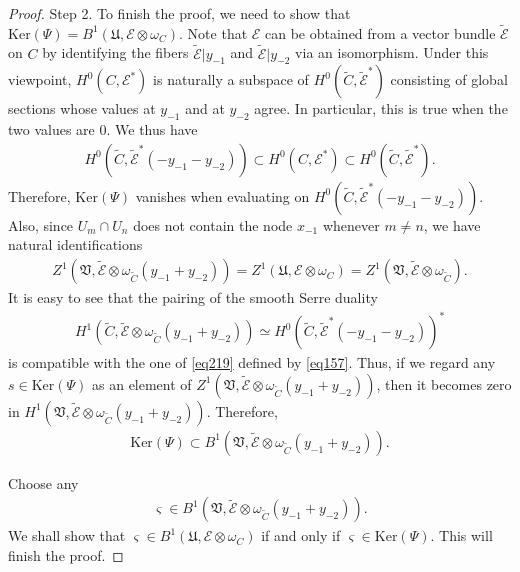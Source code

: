 \documentclass[12pt,b5paper,notitlepage]{report}
\theoremstyle{definition}
\theoremstyle{plain}
\newcommand{\fk}{\mathfrak}
\newcommand{\wtd}{\widetilde}
\newcommand{\scr}{\mathscr}
\newcommand{\sgm}{\varsigma}
\newcommand{\blt}{\bullet}
\newcommand{\Ker}{\mathrm{Ker}}
\numberwithin{equation}{section}
\begin{document}
\begin{proof}
Step 2. To finish the proof, we need to show that  $\Ker(\Psi)=B^1(\fk U,\scr E\otimes\omega_C)$. Note that $\scr E$ can be obtained from a vector bundle $\wtd{\scr E}$  on  $C$  by identifying the fibers $\wtd{\scr E}|y_{-1}$ and $\wtd{\scr E}|y_{-2}$ via an isomorphism. Under this viewpoint, $H^0(C,\scr E^*)$ is naturally a subspace of $H^0(\wtd C,\wtd{\scr E}^*)$ consisting of global sections whose values at $y_{-1}$ and at $y_{-2}$ agree. In particular, this is true when the two values are $0$. We thus have
\begin{align*}
H^0(\wtd C,\wtd{\scr E}^*(-y_{-1}-y_{-2}))\subset H^0(C,\scr E^*)\subset H^0(\wtd C,\wtd{\scr E}^*).
\end{align*}
Therefore, $\Ker(\Psi)$ vanishes when evaluating on $H^0(\wtd C,\wtd{\scr E}^*(-y_{-1}-y_{-2}))$. Also, since $U_m\cap U_n$ does not contain the node $x_{-1}$ whenever $m\neq n$, we have natural identifications
\begin{align*}
Z^1(\fk V,\wtd{\scr E}\otimes \omega_{\wtd C}(y_{-1}+y_{-2}))=Z^1(\fk U,\scr E\otimes \omega_C)=Z^1(\fk V,\wtd{\scr E}\otimes \omega_{\wtd C}).
\end{align*}
It is easy to see that the pairing of the smooth Serre duality
\begin{align}
H^1(\wtd C,\wtd{\scr E}\otimes\omega_{\wtd C}(y_{-1}+y_{-2}))\simeq H^0(\wtd C,\wtd{\scr E}^*(-y_{-1}-y_{-2}))^*\label{eq158}
\end{align}
is compatible with the one of \eqref{eq219} defined by \eqref{eq157}. Thus, if we regard any  $s\in\Ker(\Psi)$ as an element of $Z^1(\fk V,\wtd{\scr E}\otimes \omega_{\wtd C}(y_{-1}+y_{-2}))$, then it becomes zero in $H^1(\fk V,\wtd{\scr E}\otimes\omega_{\wtd C}(y_{-1}+y_{-2}))$. Therefore,
\begin{align*}
\Ker(\Psi)\subset B^1(\fk V,\wtd{\scr E}\otimes\omega_{\wtd C}(y_{-1}+y_{-2})).
\end{align*}

Choose any
\begin{align*}
\sgm\in B^1(\fk V,\wtd{\scr E}\otimes\omega_{\wtd C}(y_{-1}+y_{-2})).
\end{align*}
We shall show that $\sgm\in B^1(\fk U,\scr E\otimes\omega_C)$ if and only if $\sgm\in\Ker(\Psi)$. This will finish the proof.







\end{proof}
\end{document}
